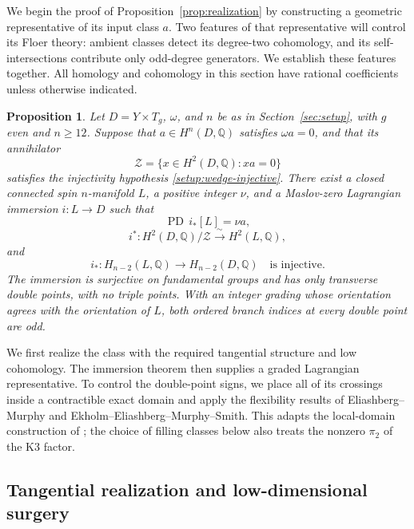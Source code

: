 \documentclass[11pt]{article}
\numberwithin{equation}{section}
\newtheorem{proposition}[theorem]{Proposition}
\theoremstyle{definition}
\theoremstyle{remark}
\begin{document}
We begin the proof of Proposition~\ref{prop:realization} by constructing
a geometric representative of its input class $a$.  Two features of that representative will control its
Floer theory: ambient classes detect its degree-two cohomology, and its
self-intersections contribute only odd-degree generators.  We establish
these features together.  All homology and cohomology in this section have
rational coefficients unless otherwise indicated.

\begin{proposition}\label{prop:immersion}
Let $D=Y\times T_g$, $\omega$, and $n$ be as in Section~\ref{sec:setup}, with
$g$ even and $n\geq12$.  Suppose that $a\in H^n(D,\mathbb Q)$ satisfies
$\omega a=0$, and that its annihilator
\[
 \mathcal Z=\{x\in H^2(D,\mathbb Q):xa=0\}
\]
satisfies the injectivity hypothesis \eqref{setup:wedge-injective}.
There exist a closed connected spin $n$-manifold $L$, a positive integer
$\nu$, and a Maslov-zero Lagrangian immersion $i:L\to D$ such that
\begin{equation}\label{topo:class}
 \operatorname{PD}\,i_*[L]=\nu a,
\end{equation}
\begin{equation}\label{topo:h2}
 i^*:H^2(D,\mathbb Q)/\mathcal Z\xrightarrow{\ \sim\ }H^2(L,\mathbb Q),
\end{equation}
and
\begin{equation}\label{topo:push}
 i_*:H_{n-2}(L,\mathbb Q)\longrightarrow H_{n-2}(D,\mathbb Q)
 \quad\text{is injective}.
\end{equation}
The immersion is surjective on fundamental groups and has only transverse
double points, with no triple points.  With an integer grading whose
orientation agrees with the orientation of $L$, both ordered branch
indices at every double point are odd.
\end{proposition}

We first realize the class with the required tangential structure and low
cohomology.  The immersion theorem then supplies a graded Lagrangian
representative.  To control the double-point signs, we place all of its
crossings inside a contractible exact domain and apply the flexibility
results of Eliashberg--Murphy and Ekholm--Eliashberg--Murphy--Smith.  This
adapts the local-domain construction of \cite[Section~3]{A8}; the choice
of filling classes below also treats the nonzero $\pi_2$ of the K3 factor.

\subsection{Tangential realization and low-dimensional surgery}
\end{document}
